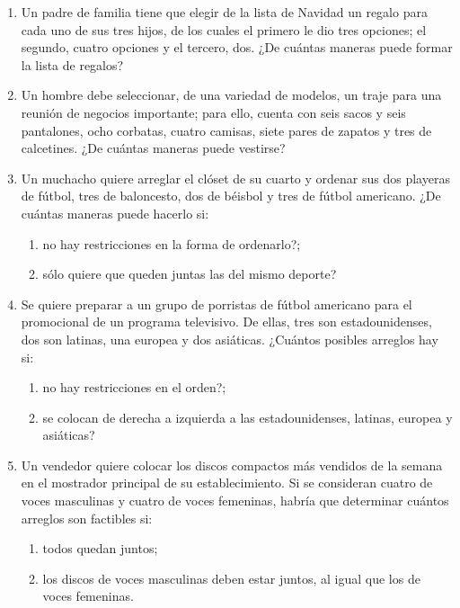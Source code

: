 \begin{Ejer}
\begin{enumerate}

\item Un padre de familia tiene que elegir de la lista de Navidad un regalo para cada uno de sus tres hijos, de los cuales el primero le dio tres opciones; el segundo, cuatro opciones y el tercero, dos. ¿De cu\'antas maneras puede formar la lista de regalos?

\item Un hombre debe seleccionar, de una variedad de modelos, un traje para una reuni\'on de negocios importante; para ello, cuenta con seis sacos y seis pantalones, ocho corbatas, cuatro camisas, siete pares de zapatos y tres de calcetines. ¿De cu\'antas maneras puede vestirse?

\item Un muchacho quiere arreglar el cl\'oset de su cuarto y ordenar sus dos playeras de f\'utbol, tres de baloncesto, dos de b\'eisbol y tres de f\'utbol americano. ¿De cu\'antas maneras puede hacerlo si:
\begin{enumerate}
\item no hay restricciones en la forma de ordenarlo?;
\item s\'olo quiere que queden juntas las del mismo deporte?
\end{enumerate}

\item Se quiere preparar a un grupo de porristas de f\'utbol americano para el promocional de un programa televisivo. De ellas, tres son estadounidenses, dos son latinas, una europea y dos asi\'aticas. ¿Cu\'antos posibles arreglos hay si:
\begin{enumerate}
\item no hay restricciones en el orden?;
\item se colocan de derecha a izquierda a las estadounidenses, latinas, europea y asi\'aticas?
\end{enumerate}

\item Un vendedor quiere colocar los discos compactos m\'as vendidos de la semana en el mostrador principal de su establecimiento. Si se consideran cuatro de voces masculinas y cuatro de voces femeninas, habr\'ia que determinar cu\'antos arreglos son factibles si:
\begin{enumerate}
\item todos quedan juntos;
\item los discos de voces masculinas deben estar juntos, al igual que los de voces femeninas.
\end{enumerate}


\end{enumerate}
\end{Ejer}
